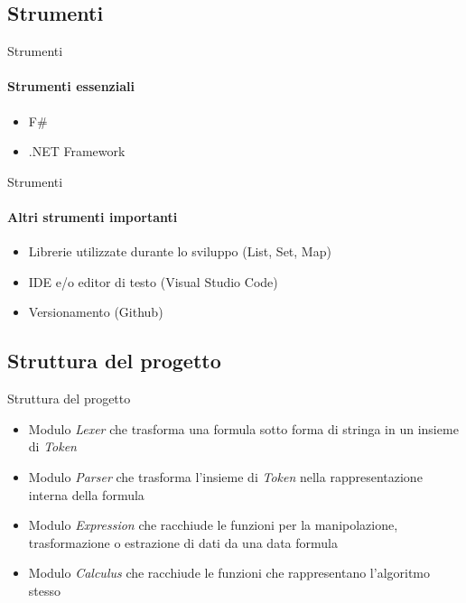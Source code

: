 \documentclass{beamer}
\begin{document}
\begin{darkframes}
    \subsection{Strumenti}
    \begin{frame}{Strumenti}
        \framesubtitle{Strumenti essenziali}
        \begin{itemize}
            \item F\#
            \item .NET Framework
        \end{itemize}
    \end{frame}

    \begin{frame}{Strumenti}
        \framesubtitle{Altri strumenti importanti}
        \begin{itemize}
            \item Librerie utilizzate durante lo sviluppo (List, Set, Map)
            \item IDE e/o editor di testo (Visual Studio Code)
            \item Versionamento (Github)
        \end{itemize}
    \end{frame}

    \subsection{Struttura del progetto}
    \begin{frame}{Struttura del progetto}
        \begin{itemize}
            \item Modulo \textit{Lexer} che trasforma una formula sotto forma di stringa in un insieme di \textit{Token}
            \item Modulo \textit{Parser} che trasforma l'insieme di \textit{Token} nella rappresentazione interna della formula
            \item Modulo \textit{Expression} che racchiude le funzioni per la manipolazione, trasformazione o estrazione di dati da una data formula
            \item Modulo \textit{Calculus} che racchiude le funzioni che rappresentano l'algoritmo stesso
        \end{itemize}
    \end{frame}


\end{darkframes}
\end{document}
